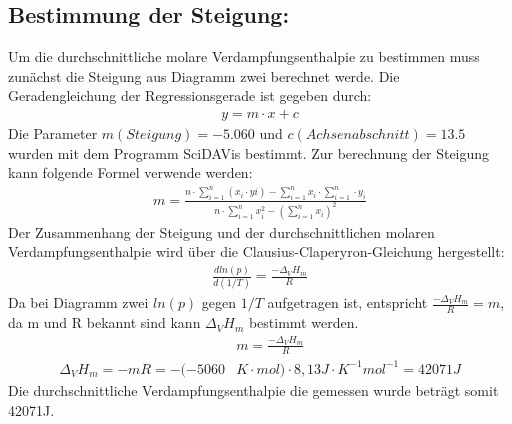 
\subsection*{Bestimmung der Steigung:}
Um die durchschnittliche molare Verdampfungsenthalpie zu bestimmen muss zunächst die Steigung aus 
Diagramm zwei berechnet werde.
Die Geradengleichung der Regressionsgerade ist gegeben durch:
\begin{align*}
    y = m \cdot x + c
\end{align*} 
Die Parameter $m(Steigung)=-5.060$ und $c(Achsenabschnitt)=13.5$ wurden mit dem Programm SciDAVis bestimmt. Zur berechnung 
der Steigung kann folgende Formel verwende werden:
\begin{align*}
    m = \frac{n \cdot \sum\limits^{n}_{i=1}(x_i \cdot yi) - \sum\limits^{n}_{i=1}x_i \cdot \sum\limits^{n}_{i=1} \cdot y_i} 
    {n \cdot \sum\limits^{n}_{i=1}x_i^2-(\sum\limits^{n}_{i=1}x_i)^2}
\end{align*} 
Der Zusammenhang der Steigung und der durchschnittlichen molaren Verdampfungsenthalpie wird über die 
Clausius-Claperyron-Gleichung hergestellt:
\begin{align*}
    \frac{d ln (p)}{d(1/T)} = \frac{-\Delta_V H_m}{R}
\end{align*}
Da bei Diagramm zwei $ln(p)$ gegen $1/T$ aufgetragen ist, entspricht $\frac{-\Delta_V H_m}{R}=m$, da m und R bekannt
sind kann $\Delta_V H_m$ bestimmt werden.
\begin{align*}
    &m = \frac{-\Delta_V H_m}{R} \\
    \Delta_V H_m = - m R = - (-5060 &K \cdot mol) \cdot 8,13 J \cdot K^{-1}  mol^{-1} = 42071J  
\end{align*} 
Die durchschnittliche Verdampfungsenthalpie die gemessen wurde beträgt somit 42071J.
\clearpage